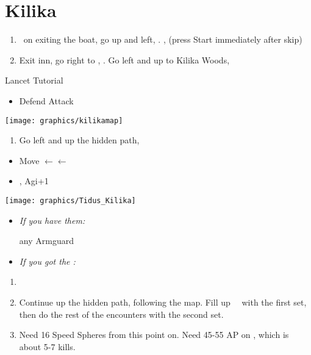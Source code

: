 \chapter{Kilika}

\begin{enumerate}
	\item \sd\ on exiting the boat, go up and left, \sd. \skippablefmv[2:00], (press Start immediately after skip) \sd
	\item Exit inn, go right to \wakka, \sd. Go left and up to Kilika Woods, \sd
\end{enumerate}
\begin{battle}{Lancet Tutorial}
	\begin{itemize}
		\item \sd
		      \kimahrif \lancet
		      \switch{\kimahri}{\yuna}
		      \yunaf Defend
		      \tidusf Attack
		      \luluf \fire
	\end{itemize}
\end{battle}
\texttt{[image: graphics/kilikamap]}
\begin{enumerate}[resume]
	\item Go left and up the hidden path, 
\end{enumerate}
\begin{spheregrid}
	\begin{itemize}
		\tidusf
		\begin{itemize}
			\item Move $\leftarrow\leftarrow$
			\item \flee, Agi+1
		\end{itemize}
	\end{itemize}
	\texttt{[image: graphics/Tidus\_Kilika]}
\end{spheregrid}
\begin{equip}
	\begin{itemize}
		\wakkaf \scout
		\item \textit{If you have them:}
		      \begin{itemize}
			      \wakkaf \iceball
			      \wakkaf any Armguard
		      \end{itemize}
		\item \textit{If you got the \icebrand:}
		      \begin{itemize}
			      \tidusf \icebrand
		      \end{itemize}
	\end{itemize}
\end{equip}
\begin{enumerate}[resume]
	\item \formation{\tidus}{\yuna}{\wakka}
	\item Continue up the hidden path, following the map. Fill up \valefor\ \od\ with the first set, then do the rest of the encounters with the second set.
	\item Need 16 Speed Spheres from this point on. Need 45-55 AP on \tidus, which is about 5-7 kills.
\end{enumerate}
